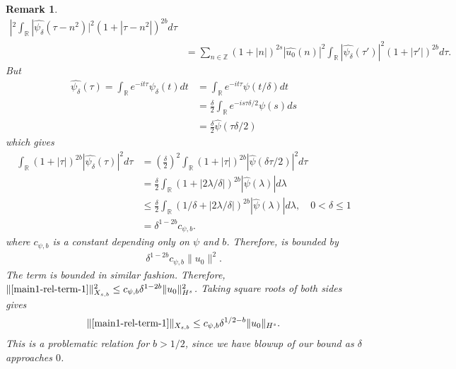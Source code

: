 \documentclass[12pt,reqno]{amsart}
\numberwithin{equation}{section}  %
\renewcommand{\cref}{\Cref}
\newcommand{\rr}{\mathbb{R}}
\newcommand{\zz}{\mathbb{Z}}
\newcommand{\wh}{\widehat}
\newtheorem{remark}[theorem]{Remark}
\begin{document}
\begin{framed}
\begin{remark}
\begin{equation}
\begin{split}
    |^{2} \int_{\rr} | \wh{\psi_{\delta}}(\tau - n^{2}) |^{2}\left( 1 +  | \tau  -
    n^{2} | \right)^{2b} d \tau
    \\
    & = \sum_{n \in \zz} \left( 1 + |n| \right)^{2s} | \wh{u_{0}}(n)
    |^{2} \int_{\rr} | \wh{\psi_{\delta}}(\tau') |^{2}\left( 1 +  | \tau'|
    \right)^{2b} d \tau.
  \end{split}
\end{equation}
%
But 
%
%
\begin{equation}
  \label{cutoff-scaling}
\begin{split}
  \wh{\psi_{\delta}}(\tau)
  = \int_{\rr} e^{-it \tau} \psi_{\delta}(t) dt
  & = \int_{\rr} e^{-it \tau} \psi(t/\delta) dt
  \\
  & = \frac{\delta}{2} \int_{\rr} e^{-is \tau \delta/2} \psi(s) ds
  \\
  & = \frac{\delta}{2} \wh{\psi}(\tau \delta/2)
\end{split}
\end{equation}
%
%
which gives
%
%
\begin{equation}
  \label{cutoff-scaling-p}
\begin{split}
  \int_{\rr} (1 + | \tau |)^{2b} | \wh{\psi_{\delta}}(\tau) |^{2} d
  \tau
  & = \left (\frac{\delta}{2} \right )^{2} \int_{\rr} (1 + | \tau |)^{2b} | \wh{\psi}(\delta \tau
  /2) |^{2} d
  \tau
  \\
  & =  \frac{\delta}{2}  \int_{\rr} (1 + | 2 \lambda /\delta |)^{2b} | \wh{\psi}(\lambda) | d \lambda
  \\
  & \le \frac{\delta}{2} \int_{\rr} (1/\delta + | 2 \lambda / \delta |)^{2b} | \wh{\psi}(\lambda) | d
  \lambda, \quad 0 < \delta \le 1
  \\
  & = \delta^{1-2b} c_{\psi,b}.
\end{split}
\end{equation}
where $c_{\psi, b}$ is a constant depending only on $\psi$ and $b$.
Therefore, \cref{1uuy} is bounded by 
\begin{equation*}
\begin{split}
  \delta^{1-2b} c_{\psi,b} \| u_{0} \|^{2}.
\end{split}
\end{equation*}
%
%
%
The
term \cref{1u-0-norm-comp-3} is bounded in similar fashion. Therefore, 
$\|\cref{main1-rel-term-1}\|_{X_{s,b}}^{2} \le c_{\psi,b} \delta^{1-2b}
\|u_{0}\|_{H^s}^2$. Taking square roots of both sides gives
%
%
\begin{equation}
  \begin{split}
    \|\cref{main1-rel-term-1}\|_{X_{s,b}} \le c_{\psi,b} \delta^{1/2-b}
    \|u_{0}\|_{H^s}.
  \end{split}
  \label{1eqn:u-0-fin-est}
\end{equation}
This is a problematic relation for $b > 1/2$, since we have blowup of our bound
as $\delta$ approaches $0$.
\end{remark}
\end{framed}
%
\end{document}

